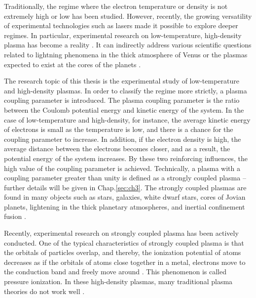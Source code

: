 Traditionally, the regime where the electron temperature or density is not extremely high or low has been studied. However, recently, the growing versatility of experimental technologies such as lasers made it possible to explore deeper regimes. In particular, experimental research on low-temperature, high-density plasma has become a reality \cite{tsuda2000calculation, murillo2004strongly, harilal2004spatial, bataller2014blackbody, bataller2016observation, langin2019laser, kroker2020ultrafast}. It can indirectly address various scientific questions related to lightning phenomena in the thick atmosphere of Venus or the plasmas expected to exist at the cores of the planets \cite{ichimaru1982strongly, rogers2013strongly, kalman2013strongly, ichimaru2012strongly}.

The research topic of this thesis is the experimental study of low-temperature and high-density plasmas. In order to classify the regime more strictly, a plasma coupling parameter is introduced. The plasma coupling parameter is the ratio between the Coulomb potential energy and kinetic energy of the system. In the case of low-temperature and high-density, for instance, the average kinetic energy of electrons is small as the temperature is low, and there is a chance for the coupling parameter to increase. In addition, if the electron density is high, the average distance between the electrons becomes closer, and as a result, the potential energy of the system increases. By these two reinforcing influences, the high value of the coupling parameter is achieved. Technically, a plasma with a coupling parameter greater than unity is defined as a strongly coupled plasma -- further details will be given in Chap.\ref{sec:ch3}. The strongly coupled plasmas are found in many objects such as stars, galaxies, white dwarf stars, cores of Jovian planets, lightening in the thick planetary atmospheres, and inertial confinement fusion \cite{ichimaru1982strongly, murillo2004strongly, ichimaru2012strongly}.

Recently, experimental research on strongly coupled plasma has been actively conducted. One of the typical characteristics of strongly coupled plasma is that the orbitals of particles overlap, and thereby, the ionization potential of atoms decreases as if the orbitals of atoms close together in a metal, electrons move to the conduction band and freely move around \cite{griem1962high, ciricosta2012direct}. This phenomenon is called pressure ionization. In these high-density plasmas, many traditional plasma theories do not work well \cite{murillo2004strongly, huebner2014opacity}.

